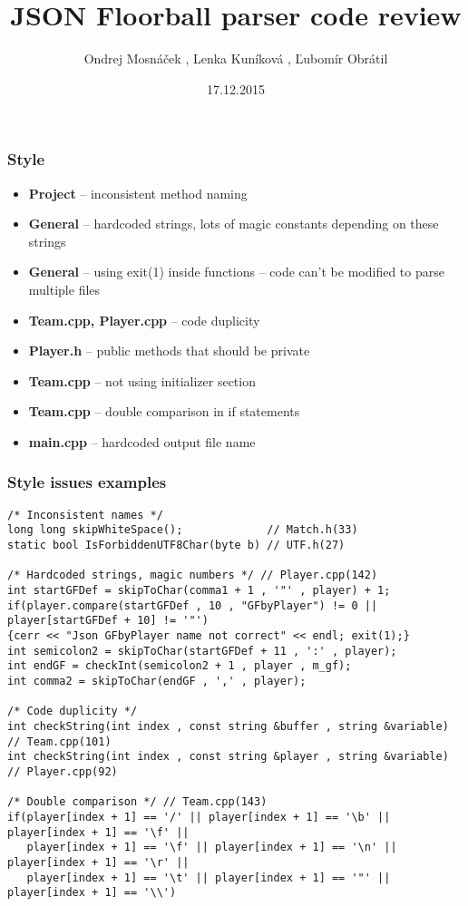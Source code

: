 \documentclass{beamer}
\title[Team P code review]{JSON Floorball parser code review} %
\author[R Team]{Ondrej Mosnáček , Lenka Kuníková , Ľubomír Obrátil} %
\date{17.12.2015} %
\begin{document}
\begin{frame}
\titlepage %
\end{frame}


\begin{frame}
\frametitle{Style}

\begin{itemize}
\item \textbf{Project} -- inconsistent method naming
\item \textbf{General} -- hardcoded strings, lots of magic constants depending on these strings
\item \textbf{General} -- using exit(1) inside functions -- code can't be modified to parse multiple files
\item \textbf{Team.cpp, Player.cpp} -- code duplicity
\item \textbf{Player.h} -- public methods that should be private
\item \textbf{Team.cpp} -- not using initializer section
\item \textbf{Team.cpp} -- double comparison in if statements
\item \textbf{main.cpp} -- hardcoded output file name
\end{itemize}

\end{frame}


\begin{frame}[fragile]
\frametitle{Style issues examples}

\begin{lstlisting}
/* Inconsistent names */
long long skipWhiteSpace();             // Match.h(33)
static bool IsForbiddenUTF8Char(byte b) // UTF.h(27)

/* Hardcoded strings, magic numbers */ // Player.cpp(142)
int startGFDef = skipToChar(comma1 + 1 , '"' , player) + 1; 
if(player.compare(startGFDef , 10 , "GFbyPlayer") != 0 || player[startGFDef + 10] != '"')
{cerr << "Json GFbyPlayer name not correct" << endl; exit(1);}
int semicolon2 = skipToChar(startGFDef + 11 , ':' , player);
int endGF = checkInt(semicolon2 + 1 , player , m_gf);
int comma2 = skipToChar(endGF , ',' , player);

/* Code duplicity */
int checkString(int index , const string &buffer , string &variable) // Team.cpp(101)
int checkString(int index , const string &player , string &variable) // Player.cpp(92)

/* Double comparison */ // Team.cpp(143)
if(player[index + 1] == '/' || player[index + 1] == '\b' || player[index + 1] == '\f' ||  
   player[index + 1] == '\f' || player[index + 1] == '\n' || player[index + 1] == '\r' ||
   player[index + 1] == '\t' || player[index + 1] == '"' || player[index + 1] == '\\')
\end{lstlisting}

\end{frame}
\end{document}
